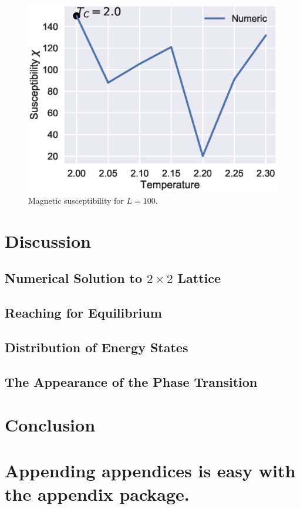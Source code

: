 \documentclass[aps,reprint]{revtex4-1}
\newcommand\blankpage{%
  \null
  \thispagestyle{empty}%
  \addtocounter{page}{-1}%
  \newpage}
\begin{document}
\begin{figure}[H]
  \centering
  \includegraphics[width=\columnwidth]{figures/L100sus.eps}
  \caption{\label{fig:100CVTc} Magnetic susceptibility for \(L=100\).}
\end{figure}

\section{Discussion}
\label{sec:discussion}

\subsection{Numerical Solution to $2\times 2$ Lattice}

\subsection{Reaching for Equilibrium}
\label{sec:reaching-equilibrium-2}


\subsection{Distribution of Energy States}
\label{sec:distr-energy-stat-2}

\subsection{The Appearance of the Phase Transition}
\label{sec:appe-phase-trans-2}

\section{Conclusion}
\label{sec:conclusion}


\blankpage
\appendix
\section{Appending appendices is easy with the appendix package.}
\blankpage
\end{document}

